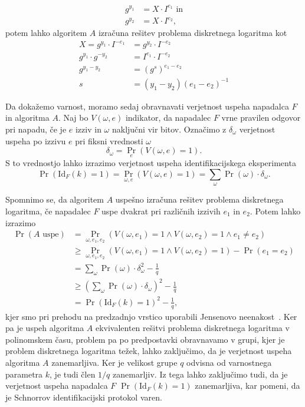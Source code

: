\begin{dokaz}
\begin{enumerate}
            \begin{align*}
                g^{y_1} &= X \cdot I^{e_1} \text{ in} \\
                g^{y_2} &= X \cdot I^{e_2},
            \end{align*}
            potem lahko algoritem $A$ izračuna rešitev problema diskretnega logaritma kot
            \begin{align*}
                X = g^{y_1} \cdot I^{-e_1} &= g^{y_2} \cdot I^{-e_2} \\
                g^{y_1} \cdot g^{-y_2} &= I^{e_1} \cdot I^{-e_2} \\
                g^{y_1 - y_2} &= (g^s)^{e_1 - e_2} \\
                s &= (y_1 - y_2)(e_1 - e_2)^{-1}
            \end{align*}
    \end{enumerate}

    Da dokažemo varnost, moramo sedaj obravnavati verjetnost uspeha napadalca $F$ in algoritma $A$.
    Naj bo $V(\omega, e)$ indikator, da napadalec $F$ vrne pravilen odgovor pri napadu, če je $e$ izziv
    in $\omega$ naključni vir bitov. Označimo z $\delta_{\omega}$ verjetnost uspeha po izzivu $e$
    pri fiksni vrednosti $\omega$
    $$
    \delta_{\omega} = \Pr_e(V(\omega, e) = 1).
    $$
    S to vrednostjo lahko izrazimo verjetnost uspeha identifikacijskega eksperimenta
    $$
    \Pr(\text{Id}_F(k) = 1) = \Pr_{\omega, e}(V(\omega, e) = 1) =
        \sum_{\omega} \Pr(\omega) \cdot \delta_{\omega}.
    $$

    Spomnimo se, da algoritem $A$ uspešno izračuna rešitev problema diskretnega logaritma, če napadalec
    $F$ uspe dvakrat pri različnih izzivih $e_1$ in $e_2$. Potem lahko izrazimo
    \begin{align*}
        \Pr(A \text{ uspe}) &=
            \Pr_{\omega, e_1, e_2}(V(\omega, e_1) = 1 \land V(\omega, e_2) = 1 \land e_1 \neq e_2) \\
                                  &\geq \Pr_{\omega, e_1, e_2}(V(\omega, e_1) = 1 \land V(\omega, e_2) = 1) - \Pr(e_1 = e_2) \\
                                  &= \sum_{\omega} \Pr(\omega) \cdot \delta_{\omega}^2 - \frac{1}{q} \\
                                  &\geq (\sum_{\omega} \Pr(\omega) \cdot \delta_{\omega})^2 - \frac{1}{q} \\
                                  &= \Pr(\text{Id}_F(k) = 1)^2 - \frac{1}{q},
    \end{align*}
    kjer smo pri prehodu na predzadnjo vrstico uporabili Jensenovo neenakost~\cite{jensen}.
    Ker pa je uspeh algoritma $A$ ekvivalenten rešitvi problema diskretnega logaritma v polinomskem
    času, problem pa po predpostavki obravnavamo v grupi, kjer je problem diskretnega logaritma težek,
    lahko zaključimo, da je verjetnost uspeha algoritma $A$ zanemarljiva. Ker je velikost grupe $q$
    odvisna od varnostnega parametra $k$, je tudi člen $1/q$ zanemarljiv. Iz tega lahko zaključimo
tudi, da je verjetnost uspeha napadalca $F$ $\Pr(\text{Id}_F(k) = 1)$ zanemarljiva, kar pomeni,
    da je Schnorrov identifikacijski protokol varen.
\end{dokaz}

